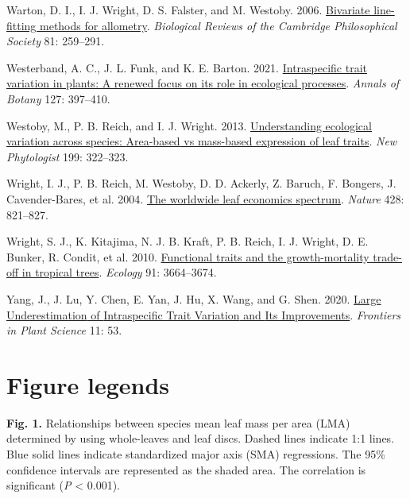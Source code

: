 \documentclass[
  12pt,
  a4paper,
,tablecaptionabove
]{scrartcl}
\newlength{\cslhangindent}
\newenvironment{CSLReferences}[2] %
 {%
  \setlength{\parindent}{0pt}
  \ifodd #1 \everypar{\setlength{\hangindent}{\cslhangindent}}\ignorespaces\fi
  \ifnum #2 > 0
  \setlength{\parskip}{#2\baselineskip}
  \fi
 }%
 {}
\begin{document}
\begin{CSLReferences}{1}{0}
\leavevmode{}%
Warton, D. I., I. J. Wright, D. S. Falster, and M. Westoby. 2006. \href{https://doi.org/10.1017/S1464793106007007}{Bivariate line-fitting methods for allometry}. \emph{Biological Reviews of the Cambridge Philosophical Society} 81: 259--291.

\leavevmode{}%
Westerband, A. C., J. L. Funk, and K. E. Barton. 2021. \href{https://doi.org/10.1093/aob/mcab011}{Intraspecific trait variation in plants: A renewed focus on its role in ecological processes}. \emph{Annals of Botany} 127: 397--410.

\leavevmode{}%
Westoby, M., P. B. Reich, and I. J. Wright. 2013. \href{https://doi.org/10.1111/nph.12345}{Understanding ecological variation across species: {Area-based} vs mass-based expression of leaf traits}. \emph{New Phytologist} 199: 322--323.

\leavevmode{}%
Wright, I. J., P. B. Reich, M. Westoby, D. D. Ackerly, Z. Baruch, F. Bongers, J. Cavender-Bares, et al. 2004. \href{https://doi.org/10.1038/nature02403}{The worldwide leaf economics spectrum}. \emph{Nature} 428: 821--827.

\leavevmode{}%
Wright, S. J., K. Kitajima, N. J. B. Kraft, P. B. Reich, I. J. Wright, D. E. Bunker, R. Condit, et al. 2010. \href{https://doi.org/10.1890/09-2335.1}{Functional traits and the growth-mortality trade-off in tropical trees}. \emph{Ecology} 91: 3664--3674.

\leavevmode{}%
Yang, J., J. Lu, Y. Chen, E. Yan, J. Hu, X. Wang, and G. Shen. 2020. \href{https://doi.org/10.3389/fpls.2020.00053}{Large {Underestimation} of {Intraspecific Trait Variation} and {Its Improvements}}. \emph{Frontiers in Plant Science} 11: 53.

\end{CSLReferences}

\newpage

\newpage

\hypertarget{figure-legends}{%
\section{Figure legends}\label{figure-legends}}

\textbf{Fig. 1.}
Relationships between species mean leaf mass per area (LMA) determined by using whole-leaves and leaf discs.
Dashed lines indicate 1:1 lines.
Blue solid lines indicate standardized major axis (SMA) regressions.
The 95\% confidence intervals are represented as the shaded area.
The correlation is significant (\emph{P} \textless{} 0.001).
\end{document}
